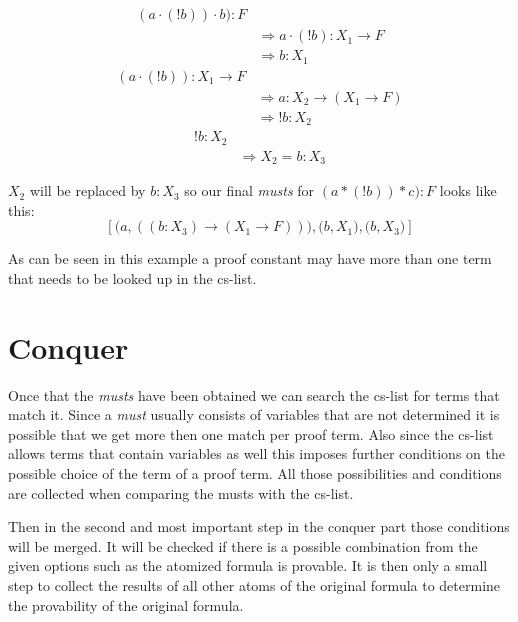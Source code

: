 \begin{equation}\label{musts}
\begin{split}
	(a \cdot (!b)) \cdot b):F \\
	& \Rightarrow a \cdot (!b):  X_1 \rightarrow F \\
	& \Rightarrow b:  X_1
\end{split}
\end{equation}
\begin{equation}\label{musts1}
\begin{split}
	(a \cdot (!b)): X_1 \rightarrow F \\
	& \Rightarrow a: X_2 \rightarrow (X_1 \rightarrow F)\\
	& \Rightarrow !b: X_2
\end{split}
\end{equation}
\begin{equation}\label{musts2}
\begin{split}
	!b: X_2 \\
	& \Rightarrow X_2 = b:X_3
\end{split}
\end{equation}

$X_2$ will be replaced by $b:X_3$ so our final \emph{musts} for $(a*(!b))*c):F$ looks like this: 
\begin{equation}\label{must-list}
 [ \bigl( a, ((b:X_3) \rightarrow (X_1 \rightarrow F)) \bigr) , \bigl( b, X_1 \bigr) , \bigl( b, X_3 \bigr) ] 
\end{equation}

As can be seen in this example a proof constant may have more than one term that needs to be looked up in the cs-list.

\section{Conquer}

Once that the \emph{musts} have been obtained we can search the cs-list for terms that match it. Since a \emph{must} usually consists of variables that are not determined it is possible that we get more then one match per proof term. Also since the cs-list allows terms that contain variables as well this imposes further conditions on the possible choice of the term of a proof term. All those possibilities and conditions are collected when comparing the musts with the cs-list.

Then in the second and most important step in the conquer part those conditions will be merged. It will be checked if there is a possible combination from the given options such as the atomized formula is provable. It is then only a small step to collect the results of all other atoms of the original formula to determine the provability of the original formula. 

